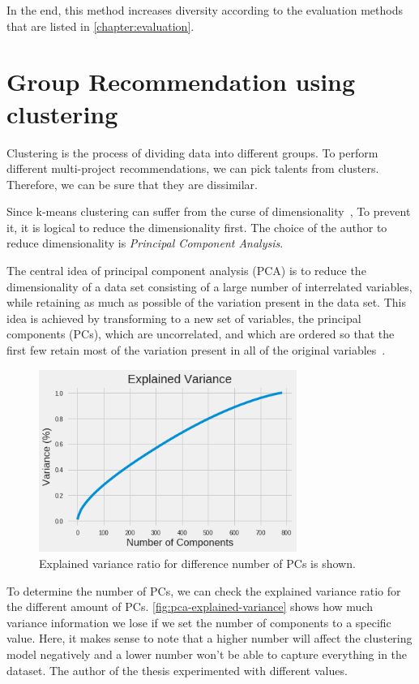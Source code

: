 In the end, this method increases diversity according to the evaluation methods that are listed in \autoref{chapter:evaluation}.

\section{Group Recommendation using clustering}

Clustering is the process of dividing data into different groups. To perform different multi-project recommendations, we can pick talents from clusters. Therefore, we can be sure that they are dissimilar. 

Since k-means clustering can suffer from the curse of dimensionality~\parencite{steinbach2004challenges}, To prevent it, it is logical to reduce the dimensionality first. The choice of the author to reduce dimensionality is \textit{Principal Component Analysis}.

The central idea of principal component analysis (PCA) is to reduce the
dimensionality of a data set consisting of a large number of interrelated
variables, while retaining as much as possible of the variation present in
the data set. This idea is achieved by transforming to a new set of variables,
the principal components (PCs), which are uncorrelated, and which are
ordered so that the first few retain most of the variation present in all of
the original variables~\parencite{jolliffe2011principal}. 

 \begin{figure}[htp]
	\centering
	\includegraphics[width=0.75\textwidth]{figures/PCAExplainedVariance.png}
	\caption{Explained variance ratio for difference number of PCs is shown.}
	\label{fig:pca-explained-variance}
\end{figure}

To determine the number of PCs, we can check the explained variance ratio for the different amount of PCs. \autoref{fig:pca-explained-variance} shows how much variance information we lose if we set the number of components to a specific value. Here, it makes sense to note that a higher number will affect the clustering model negatively and a lower number won't be able to capture everything in the dataset. The author of the thesis experimented with different values.

